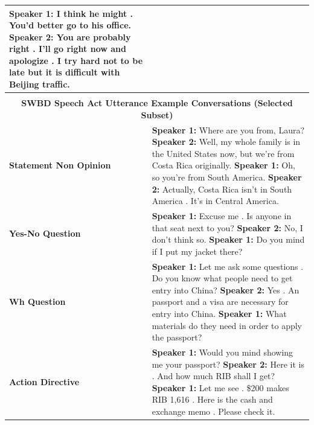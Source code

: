 \documentclass[11pt]{article}
\begin{document}
\begin{table}[ht!]
\begin{tabular}{|p{3cm}|p{11.5cm}|}
\textbf{Speaker 1:} I think he might . You'd better go to his office.\newline 
\hspace*{0.5cm} \textbf{Speaker 2:} You are probably right . I'll go right now and apologize . I try hard not to be late but it is difficult with Beijing traffic.\\\hline
     \multicolumn{2}{c}{}\\
     \multicolumn{2}{c}{\textbf{SWBD Speech Act Utterance Example Conversations (Selected Subset)}}\\\hline
      \rule{0pt}{1em}\textbf{Statement Non Opinion}   & \textbf{Speaker 1:} Where are you from, Laura?\newline 
\hspace*{0.5cm} \textbf{Speaker 2:} Well, my whole family is in the United States now, but we're from Costa Rica originally.\newline 
\textbf{Speaker 1:} Oh, so you're from South America.\newline 
\hspace*{0.5cm} \textbf{Speaker 2:} Actually, Costa Rica isn't in South America . It's in Central America. \\\hline
     \textbf{Yes-No Question}   & \textbf{Speaker 1:} Excuse me . Is anyone in that seat next to you?\newline 
\hspace*{0.5cm} \textbf{Speaker 2:} No, I don't think so.\newline 
\textbf{Speaker 1:} Do you mind if I put my jacket there? \\\hline
     \textbf{Wh Question}    & \textbf{Speaker 1:} Let me ask some questions . Do you know what people need to get entry into China?\newline 
\hspace*{0.5cm} \textbf{Speaker 2:} Yes . An passport and a visa are necessary for entry into China.\newline 
\textbf{Speaker 1:} What materials do they need in order to apply the passport? \\\hline
     \textbf{Action Directive}   & \textbf{Speaker 1:} Would you mind showing me your passport?\newline 
\hspace*{0.5cm} \textbf{Speaker 2:} Here it is . And how much RIB shall I get?\newline 
\textbf{Speaker 1:} Let me see . \$200 makes RIB 1,616 . Here is the cash and exchange memo . Please check it. \\\hline

\end{tabular}
\end{table}
\end{document}
